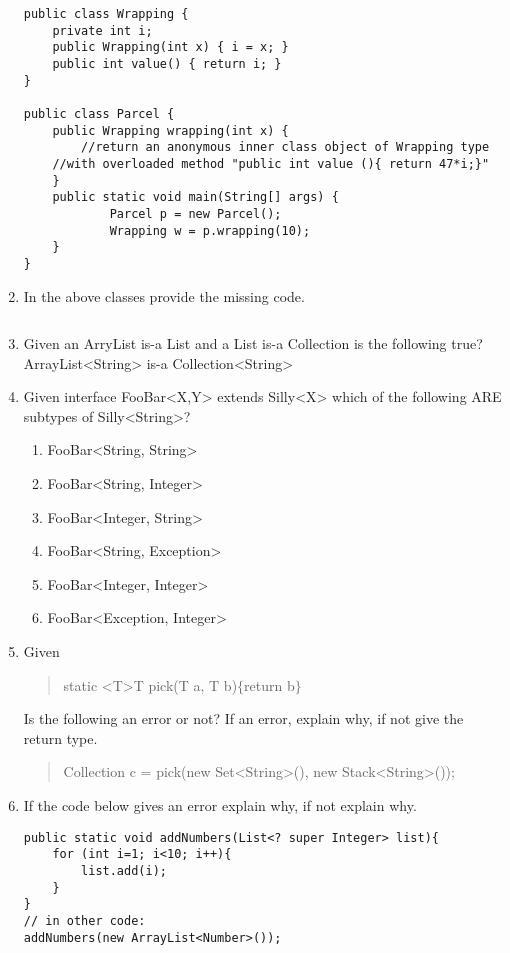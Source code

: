 \documentclass{article}
\begin{document}
\begin{enumerate}
\begin{lstlisting}
public class Wrapping {
  	private int i;
  	public Wrapping(int x) { i = x; }
  	public int value() { return i; }
}

public class Parcel {
  	public Wrapping wrapping(int x) {
    	//return an anonymous inner class object of Wrapping type
   	//with overloaded method "public int value (){ return 47*i;}"
  	}
  	public static void main(String[] args) {
    		Parcel p = new Parcel();
    		Wrapping w = p.wrapping(10);
  	}
}
\end{lstlisting}
	\item In the above classes provide the missing code.
\begin{lstlisting}
\end{lstlisting}
	\item Given an ArryList is-a List and a List is-a Collection is the following true? ArrayList<String> is-a Collection<String>\newline\newline
	\item Given interface FooBar<X,Y> extends Silly<X> which of the following ARE subtypes of Silly<String>?
	\begin{enumerate}
		\item FooBar<String, String>
		\item FooBar<String, Integer>
		\item FooBar<Integer, String>
		\item FooBar<String, Exception>
		\item FooBar<Integer, Integer>
		\item FooBar<Exception, Integer>
	\end{enumerate}
	\item Given
	\begin{quote}
		static \textless T\textgreater  T pick(T a, T b)$\{$return b$\}$
	\end{quote}
	Is the following an error or not? If an error, explain why, if not give the return type.
	\begin{quote}
		Collection c = pick(new Set\textless String\textgreater (), new Stack\textless String\textgreater());
	\end{quote}
	\newpage
	\item If the code below gives an error explain why, if not explain why.
\begin{lstlisting}
public static void addNumbers(List<? super Integer> list){
	for (int i=1; i<10; i++){
		list.add(i);
	}
}
// in other code:
addNumbers(new ArrayList<Number>());

\end{lstlisting}
\end{enumerate}
\end{document}
